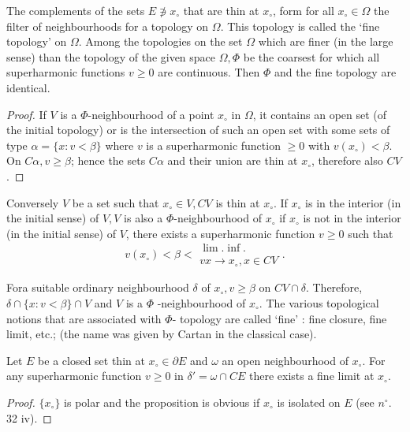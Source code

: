 \begin{thm}\label{p4:chap9:sec39:thm30} %
  The complements of the sets $E \notni x_\circ$ that are thin at $x_\circ$,
  form for all $x_\circ \in \Omega$ the filter of neighbourhoods for a
  topology on $\Omega$. This topology is called the `fine topology' on
  $\Omega$. Among the topologies on the set $\Omega$ which are finer (in
  the large sense) than the topology of the given space $\Omega, \Phi$
  be the coarsest for which all superharmonic functions $v \ge 0$ are
  continuous. Then $\Phi $ and the fine topology are identical. 
\end{thm}

\begin{proof} %
  If $V$ is a $\Phi$-neighbourhood of a point $x_\circ$ in $\Omega$, it
  contains an open set (of the initial topology) or is the
  intersection of such an open set with some sets of type $\alpha =
  \big \{x : v < \beta \big \}$ where $v$ is a superharmonic function
  $\ge 0$ with $v(x_\circ ) < \beta $. On $C \alpha, v \ge \beta$; hence
  the sets $C \alpha$ and their union are thin at $x_\circ$, therefore
  also $CV$. 
\end{proof}

Conversely $V$ be a set such that $x_\circ \in V, CV$ is thin at $x_\circ$. If
$x_\circ$ is in the interior (in the initial sense) of $V, V$ is also a
$\Phi$-neighbourhood of $x_\circ$ if $x_\circ$ is not in the interior (in the
initial sense) of $V$, there exists a superharmonic function $v \ge 0$
such that 
$$
v(x_\circ) < \beta < \substack{\lim.\inf.\\ v x \to x_\circ, x \in CV}.
$$

For\pageoriginale a suitable ordinary neighbourhood  $\delta$ of $x_\circ, v \ge \beta$
on $CV \cap \delta$. Therefore, $\delta \cap \big \{ x : v < \beta
\big \} \cap V$ and $V$ is a $\Phi$ -neighbourhood of $x_\circ$. The
various topological notions that are associated with $\Phi$- topology
are called `fine' : fine closure, fine limit, etc.; (the  name was
given by Cartan in the classical case). 

\begin{prop}\label{p4:chap9:sec39:prop26} %
  Let $E$ be a closed set thin at $x_\circ \in \partial E$ and $\omega$ an
  open neighbourhood of $x_\circ$. For any superharmonic function $v \ge
  0$ in $\delta' = \omega \cap CE$ there exists a fine limit at
  $x_\circ$. 
\end{prop}

\begin{proof} %
  $\{x_\circ\}$ is polar and the proposition is obvious if $x_\circ$ is
  isolated on $E$ (see $n^\circ$. 32 iv). 
\end{proof}

